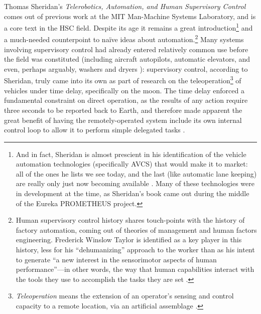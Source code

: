 
Thomas
Sheridan's \emph{Telerobotics, Automation, and Human Supervisory
  Control} comes out of previous work at the MIT Man-Machine Systems
Laboratory, and is a core text in the HSC field. Despite its
age it remains a great introduction\footnote{And in fact, Sheridan is almost prescient in his
  identification of the vehicle automation technologies (specifically AVCS) that would
  make it to market: all of the ones he lists we see today, and the
  last (like automatic lane keeping) are really only just now becoming
  available \cite[p. 256]{sheridan}. Many of these technologies were in development at the
  time, as Sheridan's book came out during the middle of the Eureka
  PROMETHEUS project.} and a
much-needed counterpoint to na\"{i}ve ideas about automation.\footnote{Human
supervisory control history
shares touch-points with the history of factory automation, coming out of
theories of management and human factors 
engineering. Frederick Winslow Taylor is identified as a key player in
this history, less for his ``dehumanizing'' approach to the worker than
as
his intent to generate ``a new interest in the sensorimotor aspects of
human performance''---in other words, the way that human capabilities
interact with the tools they use to accomplish the tasks they are
set \cite[p. 7]{sheridan}.} Many systems involving supervisory
control had already entered relatively common use before the field was
constituted (including
aircraft autopilots, automatic elevators, and even, perhaps arguably,
washers and dryers \cite[p. 8]{sheridan}): supervisory
control, according to Sheridan, truly came into its own as part of
research on the teleoperation\footnote{\emph{Teleoperation} means the
  extension of an operator's sensing and control capacity to a remote
  location, via an artificial assemblage \cite[p. 4]{sheridan}.} of vehicles under time delay,
specifically on the moon. The time delay enforced a fundamental
constraint on direct operation, as the results of any action require
three seconds to be reported back to Earth, and therefore made
apparent the great benefit of having the remotely-operated system
include its own internal control loop to allow it to perform simple
delegated tasks \cite[p. 9]{sheridan}.


